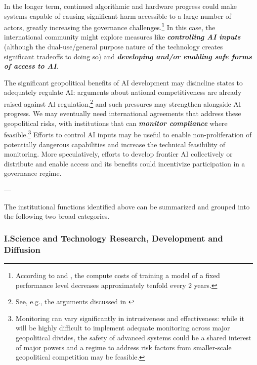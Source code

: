 \documentclass[12pt]{article}
\begin{document}
In the longer term, continued algorithmic and hardware progress could
make systems capable of causing significant harm accessible to a large
number of actors, greatly increasing the governance
challenges.\footnote{According to \cite{erdil_algorithmic_2023}
and \cite{hobbhahn_trends_2022},
the compute costs of training a model of a fixed performance level
decreases approximately tenfold every 2 years.} In this case, the
international community might explore measures like
\emph{\textbf{controlling AI inputs}} (although the dual-use/general
purpose nature of the technology creates significant tradeoffs to doing
so) and \emph{\textbf{developing and/or enabling safe forms of access to
AI}}.

The significant geopolitical benefits of AI development may disincline
states to adequately regulate AI: arguments about national
competitiveness are already raised against AI regulation,\footnote{See, e.g., the arguments discussed in \cite{toner_illusion_2023}}
and such pressures may strengthen alongside AI progress. We may
eventually need international agreements that address these geopolitical
risks, with institutions that can \emph{\textbf{monitor compliance}}
where feasible.\footnote{Monitoring can vary significantly in
intrusiveness and effectiveness: while it will be highly difficult to
implement adequate monitoring across major geopolitical divides, the
safety of advanced systems could be a shared interest of major powers
and a regime to address risk factors from smaller-scale geopolitical
competition may be feasible.} Efforts to control AI inputs may be
useful to enable non-proliferation of potentially dangerous capabilities
and increase the technical feasibility of monitoring. More
speculatively, efforts to develop frontier AI collectively or distribute
and enable access and its benefits could incentivize participation in a
governance regime.




\begin{center}
---
\end{center}




The institutional functions identified above can be summarized and
grouped into the following two broad categories.

\subsubsection*{I.\quad Science and Technology Research, Development and Diffusion}
\end{document}
